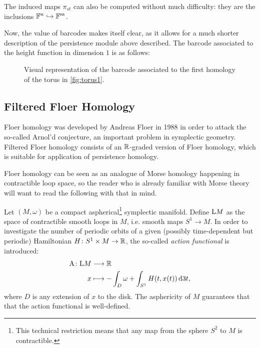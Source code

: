 The induced maps $\pi_{st}$ can also be computed without much difficulty: they are the inclusions $\mathbb{F}^n \hookrightarrow \mathbb{F}^m$.

Now, the value of barcodes makes itself clear, as it allows for a much shorter description of the persistence module above described. The barcode associated to the height function in dimension $1$ is as follows:
\begin{figure}[H]
\centering
{}
\caption{Visual representation of the barcode associated to the first homology of the torus in \ref{fig:torus1}.}\label{fig:bctorus}
\end{figure}

\subsection{Filtered Floer Homology}
\label{sec:ph}

Floer homology was developed by Andreas Floer in 1988 in order to attack the so-called Arnol'd conjecture, an important problem in symplectic geometry. Filtered Floer homology consists of an $\mathbb{R}$-graded version of Floer homology, which is suitable for application of persistence homology.

Floer homology can be seen as an analogue of Morse homology happening in contractible loop space, so the reader who is already familiar with Morse theory will want to read the following with that in mind.

Let $(M,\omega)$ be a compact aspherical\footnote{This technical restriction means that any map from the sphere $S^2$ to $M$ is contractible.} symplectic manifold. Define $\mathrm{L} M$ as the space of contractible smooth loops in $M$, i.e. smooth maps $S^1 \to M$. In order to investigate the number of periodic orbits of a given (possibly time-dependent but periodic) Hamiltonian $H \colon S^1 \times M \to \mathbb{R}$, the so-called \emph{action functional} is introduced:
\begin{equation}
\begin{aligned}
\AA \colon \LL M &\longrightarrow \R\\
x &\longmapsto -\int_D \omega + \int_{S^1} H(t, x(t)) \dl3 t,
\end{aligned}
\end{equation}
where $D$ is any extension of $x$ to the disk. The asphericity of $M$ guarantees that that the action functional is well-defined.


